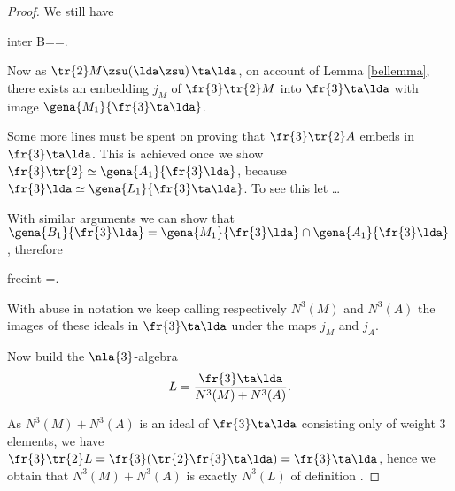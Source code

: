 \begin{proof}
We still have

\begin{labeq}{inter}
B==\cap{}.
\end{labeq}

Now as $\tr{2}M\zsu(\lda\zsu)\,\ta\lda$, on account of Lemma \ref{bellemma},
there exists an embedding $j_{M}$ of $\fr{3}\tr{2}M$ %
into $\fr{3}\ta\lda$ with image $\gena{M_{1}}{\fr{3}\ta\lda}$.

Some more lines must be spent on proving that $\fr{3}\tr{2}A$ embeds in $\fr{3}\ta\lda$.
This is achieved once we show $\fr{3}\tr{2}\simeq\gena{A_{1}}{\fr{3}\lda}$, because
$\fr{3}\lda\simeq\gena{L_{1}}{\fr{3}\ta\lda}$.
To see this let \dots

With similar arguments we can show that
$\gena{B_{1}}{\fr{3}\lda}=\gena{M_{1}}{\fr{3}\lda}\cap\gena{A_{1}}{\fr{3}\lda}$,
therefore
\begin{labeq}{freeint}
=\cap{}.
\end{labeq}

With abuse in notation we keep calling respectively
$N^{3}(M)$ and $N^{3}(A)$ the images of these ideals in $\fr{3}\ta\lda$ under the
maps $j_{M}$ and $j_{A}$.

Now build the $\nla{3}$-algebra
$$L=\frac{\fr{3}\ta\lda}{N^{3}(M)+N^{3}(A)}.$$

As $N^{3}(M)+N^{3}(A)$ is an ideal of $\fr{3}\ta\lda$ consisting only of weight $3$ elements, we have
$\fr{3}\tr{2}L=\fr{3}(\tr{2}\fr{3}\ta\lda)=\fr{3}\ta\lda$, hence we obtain that $N^{3}(M)+N^{3}(A)$ is exactly
$N^{3}(L)$ of definition .


\end{proof}
